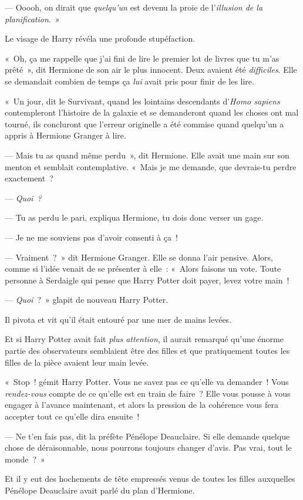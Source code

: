 --- Ooooh, on dirait que \emph{quelqu'un} est devenu la proie de l'\emph{illusion de la planification}.~»

Le visage de Harry révéla une profonde stupéfaction.

«~Oh, ça me rappelle que j'ai fini de lire le premier lot de livres que tu m'as prêté~», dit Hermione de son air le plus innocent. Deux avaient été \emph{difficiles}. Elle se demandait combien de temps ça \emph{lui} avait pris pour finir de les lire.

«~Un jour, dit le Survivant, quand les lointains descendants d'\emph{Homo sapiens} contempleront l'histoire de la galaxie et se demanderont quand les choses ont mal tourné, ils concluront que l'erreur originelle a été commise quand quelqu'un a appris à Hermione Granger à lire.

--- Mais tu as quand même perdu~», dit Hermione. Elle avait une main sur son menton et semblait contemplative. «~Mais je me demande, que devrais-tu perdre exactement~?

--- \emph{Quoi~?}

--- Tu as perdu le pari, expliqua Hermione, tu dois donc verser un gage.

--- Je ne me souviens pas d'avoir consenti à ça~!

--- Vraiment~?~» dit Hermione Granger. Elle se donna l'air pensive. Alors, comme si l'idée venait de se présenter à elle~: «~Alors faisons un vote. Toute personne à Serdaigle qui pense que Harry Potter doit payer, levez votre main~!

--- \emph{Quoi}~?~» glapit de nouveau Harry Potter.

Il pivota et vit qu'il était entouré par une mer de mains levées.

Et si Harry Potter avait fait \emph{plus attention}, il aurait remarqué qu'une énorme partie des observateurs semblaient être des filles et que pratiquement toutes les filles de la pièce avaient leur main levée.

«~Stop~! gémit Harry Potter. Vous ne savez pas ce qu'elle va demander~! Vous \emph{rendez-vous} compte de ce qu'elle est en train de faire~? Elle vous pousse à vous engager à l'avance maintenant, et alors la pression de la cohérence vous fera accepter tout ce qu'elle dira ensuite~!

--- Ne t'en fais pas, dit la préfète Pénélope Deauclaire. Si elle demande quelque chose de déraisonnable, nous pourrons toujours changer d'avis. Pas vrai, tout le monde~?~»

Et il y eut des hochements de tête empressés venus de toutes les filles auxquelles Pénélope Deauclaire avait parlé du plan d'Hermione.

